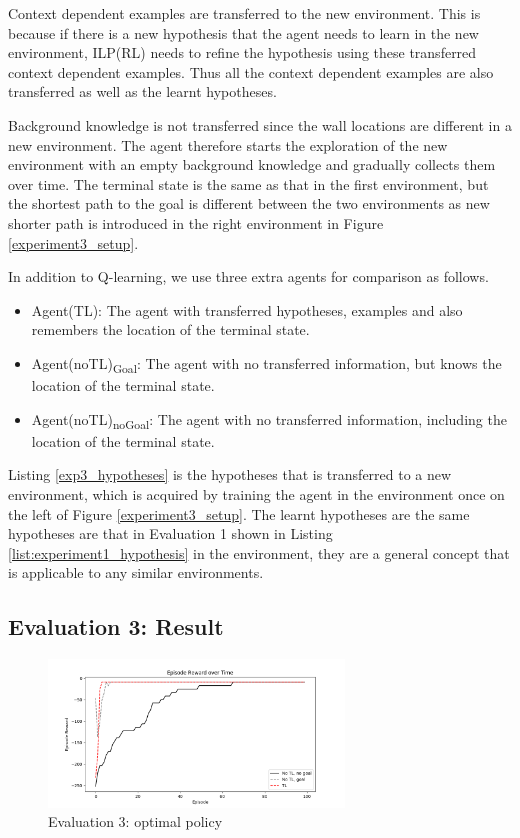 Context dependent examples are transferred to the new environment. This is because if there is a new hypothesis that the agent needs to learn in the new environment, 
ILP(RL) needs to refine the hypothesis using these transferred context dependent examples. Thus all the context dependent examples are also transferred as well as the learnt hypotheses. 

Background knowledge is not transferred since the wall locations are different in a new environment.
The agent therefore starts the exploration of the new environment with an empty background knowledge and gradually collects them over time.
The terminal state is the same as that in the first environment, but the shortest path to the goal is different between the two environments as new shorter path is introduced in the right environment in Figure \ref{experiment3_setup}.

In addition to Q-learning, we use three extra agents for comparison as follows. 

\begin{itemize}
    \item Agent(TL): The agent with transferred hypotheses, examples and also remembers the location of the terminal state.
    \item Agent(noTL)\textsubscript{Goal}: The agent with no transferred information, but knows the location of the terminal state.
    \item Agent(noTL)\textsubscript{noGoal}: The agent with no transferred information, including the location of the terminal state.
\end{itemize}



Listing \ref{exp3_hypotheses} is the hypotheses that is transferred to a new environment, which is acquired by training the agent in the environment once on the left of Figure \ref{experiment3_setup}.
The learnt hypotheses are the same hypotheses are that in Evaluation 1 shown in Listing \ref{list:experiment1_hypothesis} in the environment, they are a general concept that is applicable to any similar environments.

\subsection{Evaluation 3: Result}
\begin{figure}[!htb]
\centering
\includegraphics[width=0.7\textwidth]{./figures/experiment3_after_test}
\caption{Evaluation 3: optimal policy}
\label{experiment3_training}
\end{figure}

